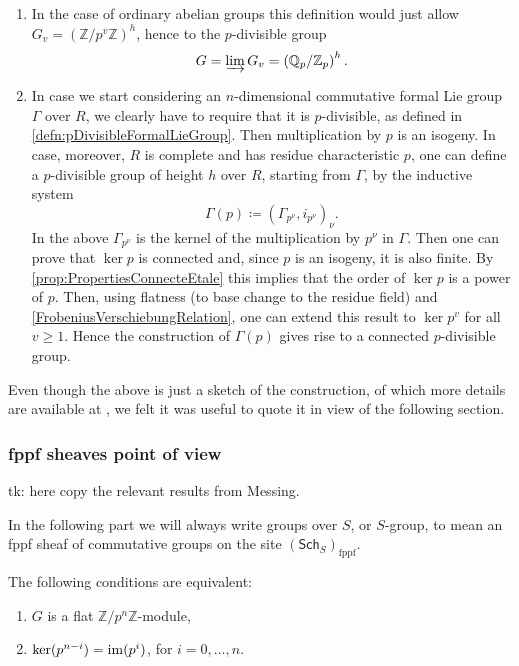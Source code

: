 \documentclass[../Main]{subfiles}
\begin{document}
\begin{ex}\leavevmode\vspace{-.2\baselineskip}\label{ex:pDivGroups}
\begin{enumerate}
\item In the case of ordinary abelian groups this definition would just allow
	$G_v = \left( \mathbb{Z}/p^v\mathbb{Z} \right)^h$, hence to the $p$-divisible group
	\begin{equation*}
		G = \varinjlim G_v = \left( \mathbb{Q}_p / \mathbb{Z}_p \right)^h
	.\end{equation*} 
\item In case we start considering an $n$-dimensional commutative\label{ConnectedpDivGroupFLG}
	formal Lie group $\Gamma$ over $R$, we clearly have to require that it is $p$-divisible,
	as defined in \cref{defn:pDivisibleFormalLieGroup}.
	Then multiplication by $p$ is an isogeny.
	In case, moreover, $R$ is complete and has residue characteristic $p$,
	one can define a $p$-divisible group of height $h$
	over $R$, starting from $\Gamma$, by the inductive system
	\begin{equation*}
		\Gamma(p) \coloneqq \left(\Gamma_{p^\nu}, i_{p^\nu}\right)_\nu
	.\end{equation*} 
	In the above $\Gamma_{p^\nu}$ is the kernel of the multiplication by $p^\nu$ 
	in $\Gamma$.
	Then one can prove that $\ker p$ is connected and, since $p$ is an isogeny,
	it is also finite.
	By \cref{prop:PropertiesConnecteEtale} this implies that the order of $\ker p$
	is a power of $p$.
	Then, using flatness (to base change to the residue field) and 
	\cref{FrobeniusVerschiebungRelation}, one can extend this result
	to $\ker p^v$ for all $v \geq 1$.
	Hence the construction of $\Gamma(p)$ gives rise to a connected $p$-divisible group.
\end{enumerate}
\end{ex}


\begin{rem}[]
	Even though the above is just a sketch of the construction, of which more details
	are available at \cite[\S6]{Shatz},
	we felt it was useful to quote it in view of the following section.
\end{rem}
\subsubsection{fppf sheaves point of view}
tk: here copy the relevant results from Messing.

In the following part we will always write groups over $S$, or $S$-group, to mean
an fppf sheaf of commutative groups on the site $(\mathsf{Sch}_{ S })_{\mathrm{fppf}}$.
\begin{lem}\label{lem:equivCondTruncatedBTGroup}
	The following conditions are equivalent:
\begin{enumerate}
	\item $G$ is a flat $\mathbb{Z}/p^n\mathbb{Z}$-module,

	\item $\ker(p^{n-i}) = \operatorname{im} (p^i)$, for $i=0, \ldots, n$.
\end{enumerate}
\end{lem} 
\end{document}
